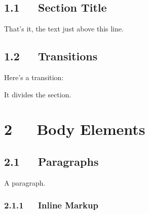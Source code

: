 \documentclass[10pt,a4paper,english]{article}
\begin{document}

\hypertarget{section-title}{}
\subsection*{1.1~~~Section Title}

That's it, the text just above this line.



\hypertarget{transitions}{}
\subsection*{1.2~~~Transitions}

Here's a transition:


\hspace*{\fill}\hrulefill\hspace*{\fill}


It divides the section.



\hypertarget{body-elements}{}
\section*{2~~~Body Elements}



\hypertarget{paragraphs}{}
\subsection*{2.1~~~Paragraphs}

A paragraph.



\hypertarget{inline-markup}{}
\subsubsection*{2.1.1~~~Inline Markup}
\end{document}
